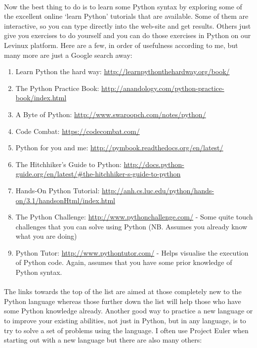 \documentclass[12pt, a4paper, twoside]{book}
\begin{document}
\paragraph{} Now the best thing to do is to learn some Python syntax by exploring some of the excellent online `learn Python' tutorials that are available. Some of them are interactive, so you can type directly into the web-site and get results. Others just give you exercises to do yourself and you can do those exercises in Python on our Levinux platform. Here are a few, in order of usefulness according to me, but many more are just a Google search away:

\begin{enumerate}
\item Learn Python the hard way: \url{http://learnpythonthehardway.org/book/}
\item The Python Practice Book: \url{http://anandology.com/python-practice-book/index.html}
\item A Byte of Python: \url{http://www.swaroopch.com/notes/python/}
\item Code Combat: \url{https://codecombat.com/}
\item Python for you and me: \url{http://pymbook.readthedocs.org/en/latest/}
\item The Hitchhiker's Guide to Python: \url{http://docs.python-guide.org/en/latest/#the-hitchhiker-s-guide-to-python}
\item Hands-On Python Tutorial: \url{http://anh.cs.luc.edu/python/hands-on/3.1/handsonHtml/index.html}
\item The Python Challenge: \url{http://www.pythonchallenge.com/} - Some quite touch challenges that you can solve using Python (NB. Assumes you already know what you are doing)
\item Python Tutor: \url{http://www.pythontutor.com/} - Helps visualise the execution of Python code. Again, assumes that you have some prior knowledge of Python syntax.
\end{enumerate}

\paragraph{} The links towards the top of the list are aimed at those completely new to the Python language whereas those further down the list will help those who have some Python knowledge already. Another good way to practice a new language or to improve your existing abilities, not just in Python, but in any language, is to try to solve a set of problems using the language. I often use Project Euler when starting out with a new language but there are also many others:
\end{document}
